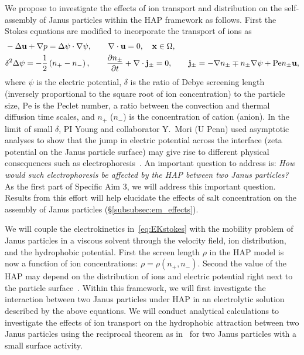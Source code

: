 We propose to investigate the effects of ion transport and distribution
on the self-assembly of Janus particles within the HAP framework as
follows. First the Stokes equations are modified to incorporate the
transport of ions as
\begin{equation}
\label{eq:EKstokes}
\begin{aligned}
  &-\Delta \mathbf{u} + \nabla p = \Delta\psi\cdot\nabla\psi, \qquad
  \nabla \cdot \mathbf{u} = 0,  \quad \mathbf{x} \in \Omega,\\
  &\delta^2\Delta\psi = -\frac{1}{2}\left(n_+-n_-\right),\qquad
  \frac{\partial n_{\pm}}{\partial t} + \nabla\cdot{\bf j}_{\pm} = 0,\qquad {\bf j}_{\pm} = -\nabla n_{\pm} \mp n_{\pm} \nabla\psi + \mbox{Pe} n_{\pm}\mathbf{u},
\end{aligned}
\end{equation}
where $\psi$ is the electric potential, $\delta$ is the ratio of Debye
screening length (inversely proportional to the square root of ion
concentration) to the particle size, $\mbox{Pe}$ is the Peclet number, a
ratio between the convection and thermal diffusion time scales, and
$n_{+}$ ($n_{-}$) is the concentration of cation (anion). In the limit
of small $\delta$, PI Young and collaborator Y.~Mori (U Penn) used
asymptotic analyses to show that the jump in electric potential across
the interface (zeta potential on the Janus particle surface) may give
rise to different physical consequences such as
electrophoresis~\cite{Mori2018_JFM}.
%
An important question to address is: {\it How would such electrophoresis
be affected by the HAP between two Janus particles?} As the first part
of Specific Aim 3, we will address this important question. Results from
this effort will help elucidate the effects of salt concentration on the
assembly of Janus particles (\S\ref{subsubsec:em_effects}).

We will couple the electrokinetics in~\eqref{eq:EKstokes} with the
mobility problem of Janus particles in a viscous solvent through the
velocity field, ion distribution, and the hydrophobic potential. First
the screen length $\rho$ in the HAP model is now a function of ion
concentrations: $\rho = \rho(n_+,n_-)$. 
%
Second the value of the HAP may depend on the distribution of ions and
electric potential right next to the particle
surface~\cite{Mori2018_JFM}. Within this framework, we will first
investigate the interaction between two Janus particles under HAP in an
electrolytic solution described by the above equations. We will conduct
analytical calculations to investigate the effects of ion transport on
the hydrophobic attraction between two Janus particles using the
reciprocal theorem as in~\cite{BayatiNajafi2016_JCP} for two Janus
particles with a small surface activity.


